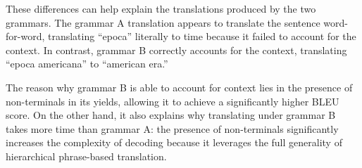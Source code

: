 \documentclass[a4paper,oneside,reqno]{amsart}
\begin{document}
\begin{enumerate}[label=\arabic*.]
    These differences can help explain the translations produced by the two
    grammars. The grammar A translation appears to translate the sentence
    word-for-word, translating ``epoca'' literally to time because it failed
    to account for the context. In contrast, grammar B correctly accounts for
    the context, translating ``epoca americana'' to ``american era.''

    The reason why grammar B is able to account for context lies in the
    presence of non-terminals in its yields, allowing it to achieve a
    significantly higher BLEU score. On the other hand, it also explains why
    translating under grammar B takes more time than grammar A: the presence of
    non-terminals significantly increases the complexity of decoding because it
    leverages the full generality of hierarchical phrase-based translation.


\end{enumerate}
\end{document}
